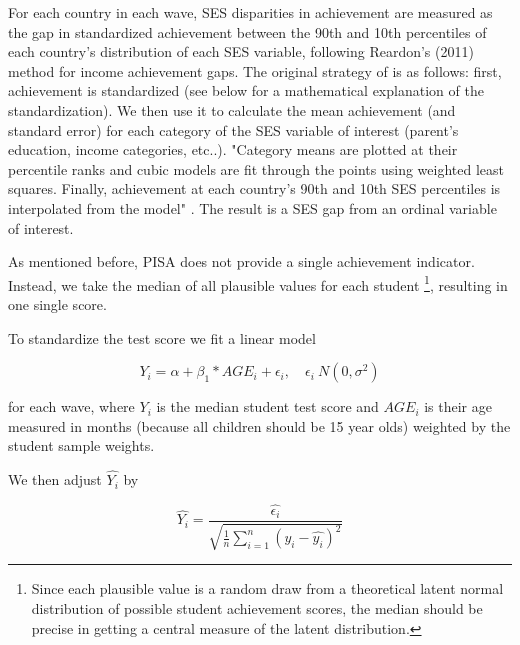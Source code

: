 \documentclass[11pt, a4paper]{article}\usepackage[]{graphicx}\usepackage[]{color}
\begin{document}
For each country in each wave, SES disparities in achievement are measured as the gap in standardized achievement between the 90th and 10th percentiles of each country’s distribution of each SES variable, following Reardon’s (2011) method for income achievement gaps. The original strategy of \citet{reardon2011} is as follows: first, achievement is standardized (see below for a mathematical explanation of the standardization). We then use it to calculate the mean achievement (and standard error) for each category of the SES variable of interest (parent's education, income categories, etc..). "Category means are plotted at their percentile ranks and cubic models are fit through the points using weighted least squares. Finally, achievement at each country’s 90th and 10th SES percentiles is interpolated from the model" \citep{anna2016_global}. The result is a SES gap from an ordinal variable of interest.

As mentioned before, PISA does not provide a single achievement indicator. Instead, we take the median of all plausible values for each student \footnote{Since each plausible value is a random draw from a theoretical latent normal distribution of possible student achievement scores, the median should be precise in getting a central measure of the latent distribution.}, resulting in one single score.

To standardize the test score we fit a linear model

\begin{equation}
Y_i = \alpha + \beta_1 * AGE_i + \epsilon_i, \quad \epsilon_i ~ N(0, \sigma^2)
\end{equation}

for each wave,  where \begin{math}Y_i\end{math} is the median student test score and \begin{math}AGE_i\end{math} is their age measured in months (because all children should be 15 year olds) weighted by the student sample weights.

We then adjust \begin{math} \hat{Y_i} \end{math} by

\begin{equation}
\hat{Y_i} = \frac{\hat{\epsilon_i}}{\sqrt{\frac{1}{n} \sum_{i=1}^{n} (y_i - \hat{y_i})^2}}
\end{equation}
\end{document}

